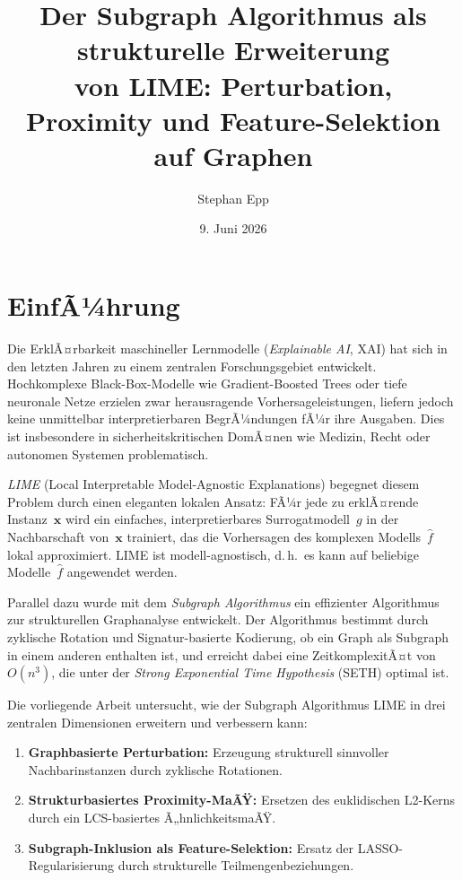 ﻿\documentclass[a4paper,12pt]{article}
\title{\textbf{Der Subgraph Algorithmus als strukturelle Erweiterung\\
von LIME: Perturbation, Proximity und Feature-Selektion\\
auf Graphen}}
\author{Stephan Epp}
\date{9. Juni 2026}
\theoremstyle{definition}
\begin{document}
\maketitle
\tableofcontents
\newpage

\section{EinfÃ¼hrung}

Die ErklÃ¤rbarkeit maschineller Lernmodelle (\emph{Explainable AI}, XAI) hat sich in den
letzten Jahren zu einem zentralen Forschungsgebiet entwickelt.
Hochkomplexe Black-Box-Modelle wie Gradient-Boosted Trees oder tiefe neuronale Netze
erzielen zwar herausragende Vorhersageleistungen, liefern jedoch keine unmittelbar
interpretierbaren BegrÃ¼ndungen fÃ¼r ihre Ausgaben.
Dies ist insbesondere in sicherheitskritischen DomÃ¤nen wie Medizin, Recht oder autonomen
Systemen problematisch.

\emph{LIME} (Local Interpretable Model-Agnostic Explanations) \citep{Ribeiro2016} begegnet
diesem Problem durch einen eleganten lokalen Ansatz: FÃ¼r jede zu erklÃ¤rende Instanz~$\mathbf{x}$
wird ein einfaches, interpretierbares Surrogatmodell~$g$ in der Nachbarschaft von~$\mathbf{x}$
trainiert, das die Vorhersagen des komplexen Modells~$\hat{f}$ lokal approximiert.
LIME ist modell-agnostisch, d.\,h.\ es kann auf beliebige Modelle~$\hat{f}$ angewendet werden.

Parallel dazu wurde mit dem \emph{Subgraph Algorithmus} \citep{Epp2026} ein effizienter
Algorithmus zur strukturellen Graphanalyse entwickelt.
Der Algorithmus bestimmt durch zyklische Rotation und Signatur-basierte Kodierung, ob ein
Graph als Subgraph in einem anderen enthalten ist, und erreicht dabei eine ZeitkomplexitÃ¤t
von $O(n^3)$, die unter der \emph{Strong Exponential Time Hypothesis} (SETH) optimal ist.

Die vorliegende Arbeit untersucht, wie der Subgraph Algorithmus LIME in drei zentralen
Dimensionen erweitern und verbessern kann:
\begin{enumerate}
  \item \textbf{Graphbasierte Perturbation:} Erzeugung strukturell sinnvoller
        Nachbarinstanzen durch zyklische Rotationen.
  \item \textbf{Strukturbasiertes Proximity-MaÃŸ:} Ersetzen des euklidischen
        L2-Kerns durch ein LCS-basiertes Ã„hnlichkeitsmaÃŸ.
  \item \textbf{Subgraph-Inklusion als Feature-Selektion:} Ersatz der
        LASSO-Regularisierung durch strukturelle Teilmengenbeziehungen.
\end{enumerate}
\end{document}
